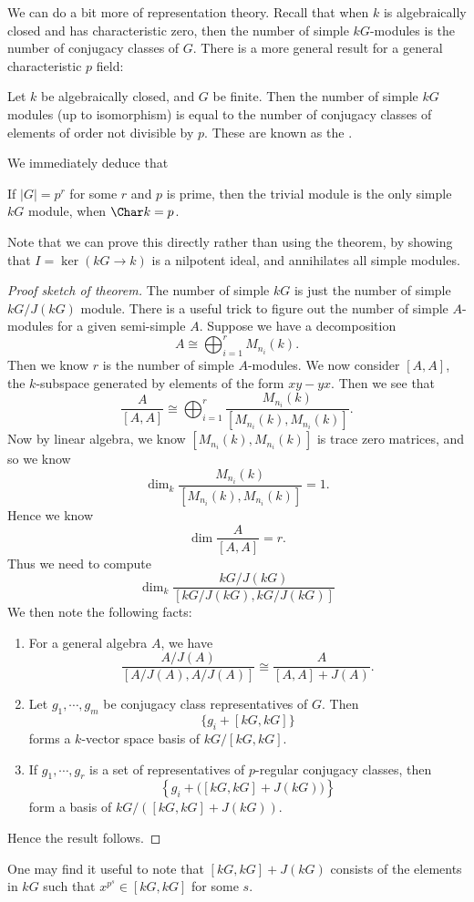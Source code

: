 \documentclass[a4paper]{article}
\begin{document}
We can do a bit more of representation theory. Recall that when $k$ is algebraically closed and has characteristic zero, then the number of simple $kG$-modules is the number of conjugacy classes of $G$. There is a more general result for a general characteristic $p$ field:
\begin{thm}
  Let $k$ be algebraically closed, and $G$ be finite. Then the number of simple $kG$ modules (up to isomorphism) is equal to the number of conjugacy classes of elements of order not divisible by $p$. These are known as the .
\end{thm}

We immediately deduce that
\begin{cor}
  If $|G| = p^r$ for some $r$ and $p$ is prime, then the trivial module is the only simple $kG$ module, when $\Char k = p$.
\end{cor}
Note that we can prove this directly rather than using the theorem, by showing that $I = \ker (kG \to k)$ is a nilpotent ideal, and annihilates all simple modules. %

\begin{proof}[Proof sketch of theorem]
  The number of simple $kG$ is just the number of simple $kG/J(kG)$ module. %
  There is a useful trick to figure out the number of simple $A$-modules for a given semi-simple $A$. Suppose we have a decomposition
  \[
    A \cong \bigoplus_{i = 1}^r M_{n_i}(k).
  \]
  Then we know $r$ is the number of simple $A$-modules. We now consider $[A, A]$, the $k$-subspace generated by elements of the form $xy - yx$. Then we see that
  \[
    \frac{A}{[A, A]} \cong \bigoplus_{i = 1}^r \frac{M_{n_i}(k)}{[M_{n_i}(k), M_{n_i}(k)]}.
  \]
  Now by linear algebra, we know $[M_{n_i}(k), M_{n_i}(k)]$ is trace zero matrices, and so we know
  \[
    \dim_k \frac{M_{n_i}(k)}{[M_{n_i}(k), M_{n_i}(k)]} = 1.
  \]
  Hence we know
  \[
    \dim \frac{A}{[A, A]} = r.
  \]
  Thus we need to compute
  \[
    \dim_k \frac{kG/J(kG)}{[kG/J(kG), kG/J(kG)]}
  \]
  We then note the following facts:
  \begin{enumerate}
    \item For a general algebra $A$, we have
      \[
        \frac{A/J(A)}{[A/J(A), A/J(A)]} \cong \frac{A}{[A, A] + J(A)}.
      \]
    \item Let $g_1, \cdots, g_m$ be conjugacy class representatives of $G$. Then
      \[
        \{g_i + [kG, kG]\}
      \]
      forms a $k$-vector space basis of $kG/[kG, kG]$. %
    \item If $g_1, \cdots, g_r$ is a set of representatives of $p$-regular conjugacy classes, then
      \[
        \left\{g_i + \Big([kG, kG] + J(kG)\Big)\right\}
      \]
      form a basis of $kG/([kG, kG] + J(kG))$. %
  \end{enumerate}
  Hence the result follows.
\end{proof}
One may find it useful to note that $[kG, kG] + J(kG)$ consists of the elements in $kG$ such that $x^{p^s} \in [kG, kG]$ for some $s$.
\end{document}
